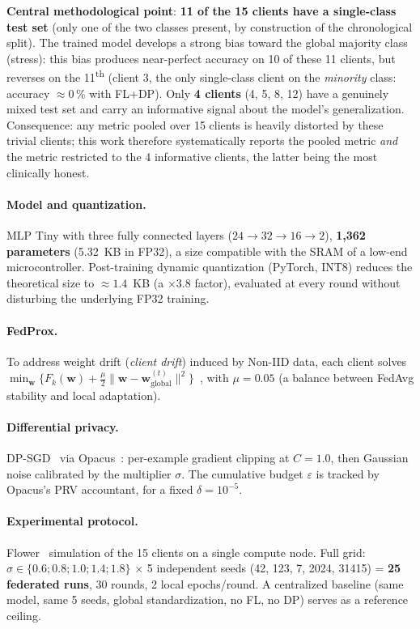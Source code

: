 \documentclass{acmart}
\begin{document}
\textbf{Central methodological point}: \textbf{11 of the 15 clients have a
single-class test set} (only one of the two classes present, by construction of the
chronological split). The trained model develops a strong bias toward the global
majority class (stress): this bias produces near-perfect accuracy on 10 of these 11
clients, but reverses on the 11\textsuperscript{th} (client 3, the only single-class
client on the \emph{minority} class: accuracy $\approx0\,\%$ with FL+DP). Only
\textbf{4 clients} (4, 5, 8, 12) have a genuinely mixed test set and carry an
informative signal about the model's generalization. Consequence: any metric pooled
over 15 clients is heavily distorted by these trivial clients; this work therefore
systematically reports the pooled metric \emph{and} the metric restricted to the 4
informative clients, the latter being the most clinically honest.

\paragraph{Model and quantization.} MLP Tiny with three fully connected layers
($24\to32\to16\to2$), \textbf{1,362 parameters} (5.32~KB in FP32), a size compatible
with the SRAM of a low-end microcontroller. Post-training dynamic quantization
(PyTorch, INT8) reduces the theoretical size to $\approx1.4$~KB (a $\times3.8$
factor), evaluated at every round without disturbing the underlying FP32 training.

\paragraph{FedProx.} To address weight drift (\textit{client drift}) induced by
Non-IID data, each client solves $\min_{\mathbf w}\{F_k(\mathbf w) + \frac{\mu}{2}\|\mathbf
w - \mathbf w^{(t)}_{\text{global}}\|^2\}$~\cite{li2020fedprox}, with $\mu=0.05$
(a balance between FedAvg stability and local adaptation).

\paragraph{Differential privacy.} DP-SGD~\cite{abadi2016deep} via
Opacus~\cite{opacus}: per-example gradient clipping at $C=1.0$, then Gaussian noise
calibrated by the multiplier $\sigma$. The cumulative budget $\varepsilon$ is tracked
by Opacus's PRV accountant, for a fixed $\delta=10^{-5}$.

\paragraph{Experimental protocol.} Flower~\cite{beutel2020flower} simulation of the
15 clients on a single compute node. Full grid: $\sigma\in\{0.6;0.8;1.0;1.4;1.8\}$
$\times$ 5 independent seeds (42, 123, 7, 2024, 31415) = \textbf{25 federated runs},
30 rounds, 2 local epochs/round. A centralized baseline (same model, same 5 seeds,
global standardization, no FL, no DP) serves as a reference ceiling.
\end{document}
